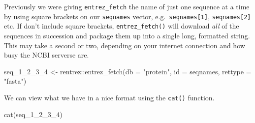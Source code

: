 \documentclass[
]{book}
\newenvironment{Shaded}{\begin{snugshade}}{\end{snugshade}}
\newcommand{\AttributeTok}[1]{\textcolor[rgb]{0.77,0.63,0.00}{#1}}
\newcommand{\FunctionTok}[1]{\textcolor[rgb]{0.00,0.00,0.00}{#1}}
\newcommand{\NormalTok}[1]{#1}
\newcommand{\OtherTok}[1]{\textcolor[rgb]{0.56,0.35,0.01}{#1}}
\newcommand{\SpecialCharTok}[1]{\textcolor[rgb]{0.00,0.00,0.00}{#1}}
\newcommand{\StringTok}[1]{\textcolor[rgb]{0.31,0.60,0.02}{#1}}
\begin{document}
Previously we were giving \texttt{entrez\_fetch} the name of just one sequence at a time by using square brackets on our \texttt{seqnames} vector, e.g.~\texttt{seqnames{[}1{]}}, \texttt{seqnames{[}2{]}} etc. If don't include square brackets, \texttt{entrez\_fetch()} will download \emph{all} of the sequences in succession and package them up into a single long, formatted string. This may take a second or two, depending on your internet connection and how busy the NCBI serverse are.

\begin{Shaded}
\begin{Highlighting}[]
\NormalTok{seq\_1\_2\_3\_4 }\OtherTok{\textless{}{-}}\NormalTok{ rentrez}\SpecialCharTok{::}\FunctionTok{entrez\_fetch}\NormalTok{(}\AttributeTok{db =} \StringTok{"protein"}\NormalTok{, }
                          \AttributeTok{id =}\NormalTok{ seqnames, }
                          \AttributeTok{rettype =} \StringTok{"fasta"}\NormalTok{)}
\end{Highlighting}
\end{Shaded}

We can view what we have in a nice format using the \texttt{cat()} function.

\begin{Shaded}
\begin{Highlighting}[]
\FunctionTok{cat}\NormalTok{(seq\_1\_2\_3\_4)}
\end{Highlighting}
\end{Shaded}
\end{document}
